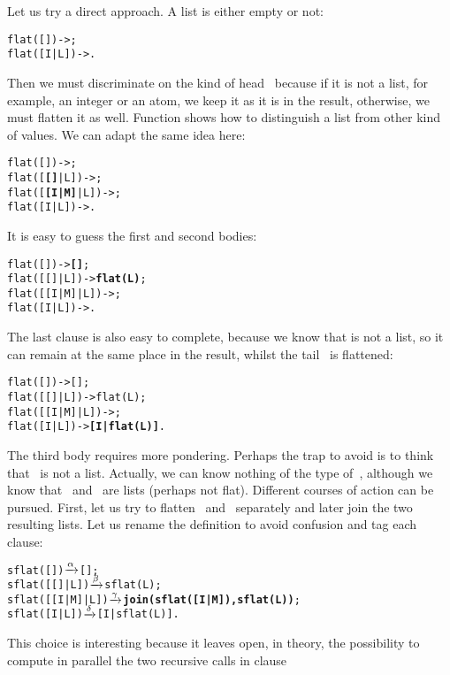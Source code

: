 Let us try a direct approach. A list is either empty or not:
\begin{alltt}
flat(   []) -> ;
flat([I|L]) -> .
\end{alltt}
Then we must discriminate on the kind of head~ because if
it is not a list, for example, an integer or an atom, we keep it as it
is in the result, otherwise, we must flatten it as well. Function
  shows how to
distinguish a list from other kind of values. We can adapt the same
idea here:
\begin{alltt}
flat(       []) -> ;
flat(   [\textbf{[]}|L]) -> ;
flat([\textbf{[I|M]}|L]) -> ;
flat(    [I|L]) -> .\hfill% I \emph{not a list}
\end{alltt}
It is easy to guess the first and second bodies:
\begin{alltt}
flat(       []) -> \textbf{[]};
flat(   [[]|L]) -> \textbf{flat(L)};\hfill% \emph{Skipping} []
flat([[I|M]|L]) -> ;
flat(    [I|L]) -> .
\end{alltt}
The last clause is also easy to complete, because we know that
 is not a list, so it can remain at the same place in the
result, whilst the tail~ is flattened:
\begin{alltt}
flat(       []) -> [];
flat(   [[]|L]) -> flat(L);
flat([[I|M]|L]) -> ;
flat(    [I|L]) -> \textbf{[I|flat(L)]}.\hfill% \emph{Keeping} I
\end{alltt}
The third body requires more pondering. Perhaps the trap to avoid is
to think that ~is not a list. Actually, we can know nothing
of the type of~, although we know that
~and~ are lists (perhaps not flat). Different
courses of action can be pursued. First, let us try to flatten
\erlcode{[I|M]}~and~ separately and later join the two
resulting lists. Let us rename the definition to avoid confusion and
tag each clause:\label{code:sflat_par_alpha}
\begin{alltt}
sflat(       []) \(\smashedrightarrow{\alpha}\) [];
sflat(   [[]|L]) \(\smashedrightarrow{\beta}\) sflat(L);
sflat([[I|M]|L]) \(\smashedrightarrow{\gamma}\) \textbf{join(sflat([I|M]),sflat(L))};
sflat(    [I|L]) \(\smashedrightarrow{\delta}\) [I|sflat(L)].
\end{alltt}
This choice is interesting because it leaves open, in theory, the
possibility to compute in parallel the two recursive calls in clause
